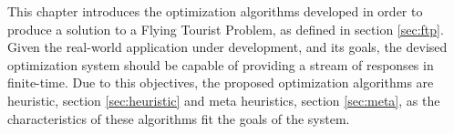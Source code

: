 This chapter introduces the optimization algorithms developed in order to produce a solution to a Flying Tourist Problem, as defined in section \ref{sec:ftp}. 
Given the real-world application under development, and its goals, the devised optimization system should be capable of providing a stream of responses in finite-time. Due to this objectives, the proposed optimization algorithms are heuristic, section \ref{sec:heuristic} and meta heuristics, section \ref{sec:meta}, as the characteristics of these algorithms fit the goals of the system.


